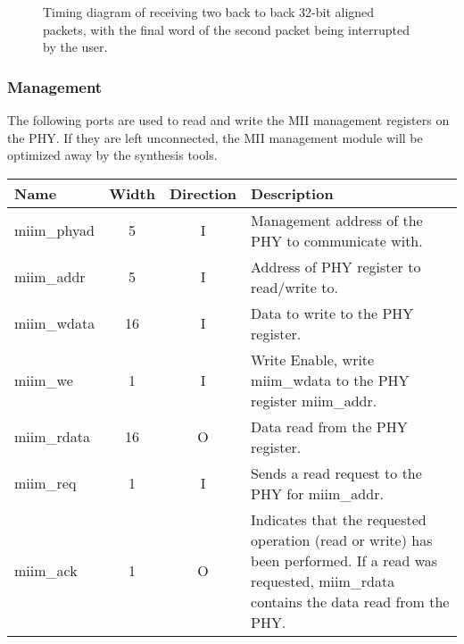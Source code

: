 \documentclass[11pt]{article}
\begin{document}
\begin{figure}
\begin{timing}[2s]{0.6in}
  
  
    
   
\end{timing}
\caption{Timing diagram of receiving two back to back 32-bit aligned
  packets, with the final word of the second packet being interrupted
  by the user.}
\label{fig:timing-recp}
\end{figure}


\subsubsection{Management}
\label{sec:management}

The following ports are used to read and write the MII management
registers on the PHY.  If they are left unconnected, the MII
management module will be optimized away by the synthesis tools.

\vskip 12pt\noindent\begin{tabular}{p{0.85in}ccp{4.0in}}
\hline
Name & Width & Direction & Description \\
\hline

\hline miim\_phyad & 5  & I & Management address of the PHY to
communicate with. \\

\hline miim\_addr  & 5  & I & Address of PHY register to read/write
to. \\

\hline miim\_wdata & 16 & I & Data to write to the PHY register. \\

\hline miim\_we    & 1  & I & Write Enable, write miim\_wdata to the PHY
register miim\_addr. \\

\hline miim\_rdata & 16 & O & Data read from the PHY register. \\

\hline miim\_req   & 1  & I & Sends a read request to the PHY for
miim\_addr. \\

\hline miim\_ack   & 1  & O & Indicates that the requested operation
(read or write) has been performed.  If a read was requested,
miim\_rdata contains the data read from the PHY. \\

\hline
\end{tabular}
\end{document}
